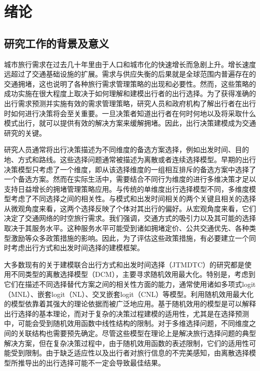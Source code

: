 \chapter{绪论}
\label{chp:installation}


\section{研究工作的背景及意义}









城市旅行需求在过去几十年里由于人口和城市化的快速增长而急剧上升。增长速度远超过了交通基础设施的扩展。需求与供应失衡的后果就是全球范围内普遍存在的交通拥堵，这也说明了各种旅行需求管理策略的出现和必要性。然而，这些策略的成功实施在很大程度上取决于如何理解和建模出行者的出行选择。为了获得准确的出行需求预测并实施有效的需求管理策略，研究人员和政府机构了解出行者在出行时如何进行决策将会至关重要。一旦决策者知道出行者在何时何地以及将采取什么模式出行，就可以提供有效的解决方案来缓解拥堵。因此，出行决策建模成为交通研究的关键。

研究人员通常将出行决策描述为不同维度的备选方案选择，例如出发时间、目的地、方式和路线。这些选择问题通常被描述为离散或者连续选择模型。早期的出行决策模型只考虑了一个维度，即从该选择维度的一组相互排斥的备选方案中选择了一个备选方案。然而在实际生活中，需要结合不同行为维度的进行多维决策才足以支持日益增长的拥堵管理策略应用。与传统的单维度出行选择模型不同，多维度模型考虑了不同选择之间的相关性。与模式和出发时间相关的两个关键且相关的选择从微观角度来看，这两个选择反映了个体对其出行的偏好。从宏观角度来看，它们决定了交通网络的时空旅行需求。我们强调，交通方式的吸引力以及其可能的选择取决于其服务水平。这种服务水平可能受到诸如拥堵定价、公共交通优先、各种类型激励等众多政策措施的影响。因此，为了评估这些政策措施，有必要建立一个同时考虑出行方式和出发时间选择的建模框架。



大多数现有的关于建模联合出行方式和出发时间选择（JTMDTC）的研究都是使用不同类型的离散选择模型（DCM），主要寻求随机效用最大化。特别是，考虑到它们在描述不同选择替代方案之间的相关性方面的能力，通常使用诸如多项式logit（MNL）、嵌套logit（NL）、交叉嵌套logit（CNL）等模型。利用随机效用最大化的模型依靠着其强大的理论依据而被广泛地应用。基于随机效用的模型是可以解释出行选择的基本理论，而对于复杂的决策过程建模的适用性，尤其是在选择预测中，可能会受到随机效用函数中线性结构的限制。对于多维选择问题，不同维度之间的关联结构也需要预先确定。尽管这些模型在理论上是解决旅行选择问题的典型解决方案，但在复杂决策过程中，由于随机效用函数的表述限制，它们的适用性可能受到限制。由于缺乏适应性以及出行者对旅行信息的不完美感知，由离散选择模型所推导出的出行选择可能不一定会导致最佳结果。

